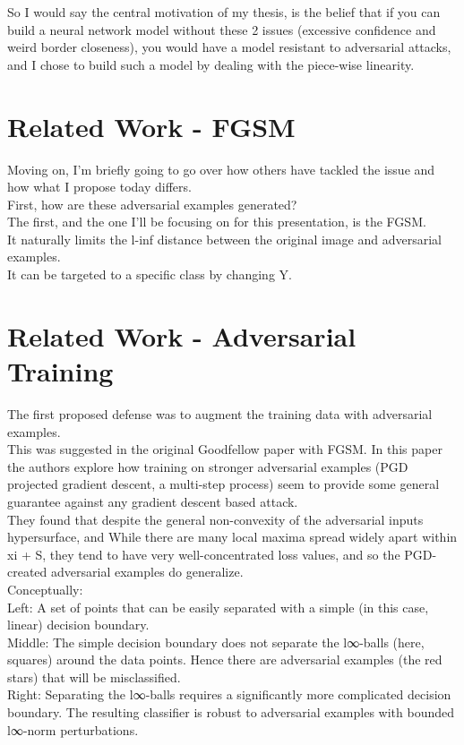 \documentclass{article}
\begin{document}
So I would say the central motivation of my thesis, is the belief that if you can build a neural network model without these 2 issues (excessive confidence and weird border closeness), you would have a model resistant to adversarial attacks, and I chose to build such a model by dealing with the piece-wise linearity.

\section{Related Work - FGSM }
Moving on, I'm briefly going to go over how others have tackled the issue and how what I propose today differs.\\
First, how are these adversarial examples generated?\\
The first, and the one I'll be focusing on for this presentation, is the FGSM.\\
It naturally limits the l-inf distance between the original image and adversarial examples.\\
It can be targeted to a specific class by changing Y.\\

\section{Related Work - Adversarial Training}
The first proposed defense was to augment the training data with adversarial examples.\\
This was suggested in the original Goodfellow paper with FGSM. In this paper the authors explore how training on stronger adversarial examples (PGD projected gradient descent, a multi-step process) seem to provide some general guarantee against any gradient descent based attack.\\
They found that despite the general non-convexity of the adversarial inputs hypersurface, and While there are many local maxima spread widely apart within xi + S, they tend to have very well-concentrated loss values, and so the PGD-created adversarial examples do generalize.\\
Conceptually: \\
Left: A set of points that can be easily separated with a simple (in this case, linear) decision boundary.\\
Middle: The simple decision boundary does not separate the l∞-balls (here, squares) around the data points. Hence there are adversarial examples (the red stars) that will be misclassified.\\
Right: Separating the  l∞-balls requires a significantly more complicated decision boundary. The resulting classifier is robust to adversarial examples with bounded l∞-norm perturbations.
\end{document}
